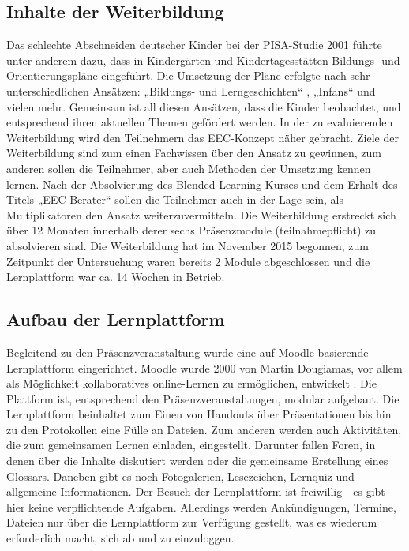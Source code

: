 \documentclass[12pt, bibliography=totoc]{scrartcl}
\begin{document}
\subsection{Inhalte der Weiterbildung}\label{inhalte-der-weiterbildung}

Das schlechte Abschneiden deutscher Kinder bei der PISA-Studie 2001
führte unter anderem dazu, dass in Kindergärten und Kindertagesstätten
Bildungs- und Orientierungspläne eingeführt. Die Umsetzung der Pläne
erfolgte nach sehr unterschiedlichen Ansätzen: „Bildungs- und
Lerngeschichten`` \parencite{leu2007bildungs}, „Infans``
\parencite{laewen2011infans} und vielen mehr. Gemeinsam ist all diesen
Ansätzen, dass die Kinder beobachtet, und entsprechend ihren aktuellen
Themen gefördert werden. In der zu evaluierenden Weiterbildung wird den
Teilnehmern das EEC-Konzept \parencite{hebenstreit2007early} näher
gebracht. Ziele der Weiterbildung sind zum einen Fachwissen über den
Ansatz zu gewinnen, zum anderen sollen die Teilnehmer, aber auch
Methoden der Umsetzung kennen lernen. Nach der Absolvierung des Blended
Learning Kurses und dem Erhalt des Titels „EEC-Berater`` sollen die
Teilnehmer auch in der Lage sein, als Multiplikatoren den Ansatz
weiterzuvermitteln. Die Weiterbildung erstreckt sich über 12 Monaten
innerhalb derer sechs Präsenzmodule (teilnahmepflicht) zu absolvieren
sind. Die Weiterbildung hat im November 2015 begonnen, zum Zeitpunkt der
Untersuchung waren bereits 2 Module abgeschlossen und die Lernplattform
war ca. 14 Wochen in Betrieb.

\subsection{Aufbau der Lernplattform}\label{aufbau-der-lernplattform}

Begleitend zu den Präsenzveranstaltung wurde eine auf Moodle basierende
Lernplattform eingerichtet. Moodle wurde 2000 von Martin Dougiamas, vor
allem als Möglichkeit kollaboratives online-Lernen zu ermöglichen,
entwickelt \parencite{dougiamas2002interpretive}. Die Plattform ist,
entsprechend den Präsenzveranstaltungen, modular aufgebaut. Die
Lernplattform beinhaltet zum Einen von Handouts über Präsentationen bis
hin zu den Protokollen eine Fülle an Dateien. Zum anderen werden auch
Aktivitäten, die zum gemeinsamen Lernen einladen, eingestellt. Darunter
fallen Foren, in denen über die Inhalte diskutiert werden oder die
gemeinsame Erstellung eines Glossars. Daneben gibt es noch Fotogalerien,
Lesezeichen, Lernquiz und allgemeine Informationen. Der Besuch der
Lernplattform ist freiwillig - es gibt hier keine verpflichtende
Aufgaben. Allerdings werden Ankündigungen, Termine, Dateien nur über die
Lernplattform zur Verfügung gestellt, was es wiederum erforderlich
macht, sich ab und zu einzuloggen.
\end{document}
